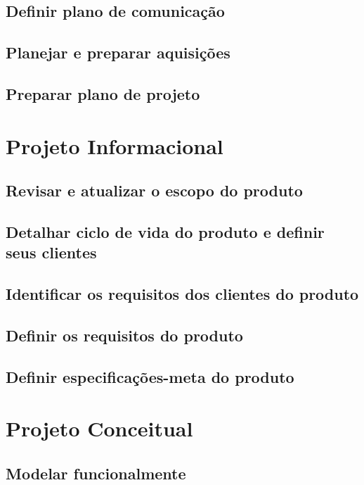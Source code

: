 \documentclass[
	12pt,				%
	openright,			%
	oneside,			%
	a4paper,			%
	english,			%
	french,				%
	spanish,			%
	brazil				%
	]{abntex2}
\begin{document}
\section{Definir plano de comunicação}

\section{Planejar e preparar aquisições}

\section{Preparar plano de projeto}


\newpage
\chapter{Projeto Informacional}

\section{Revisar e atualizar o escopo do produto}

\section{Detalhar ciclo de vida do produto e definir seus clientes}

\section{Identificar os requisitos dos clientes do produto}

\section{Definir os requisitos do produto}

\section{Definir especificações-meta do produto}


\newpage
\chapter{Projeto Conceitual}

\section{Modelar funcionalmente}
\end{document}
